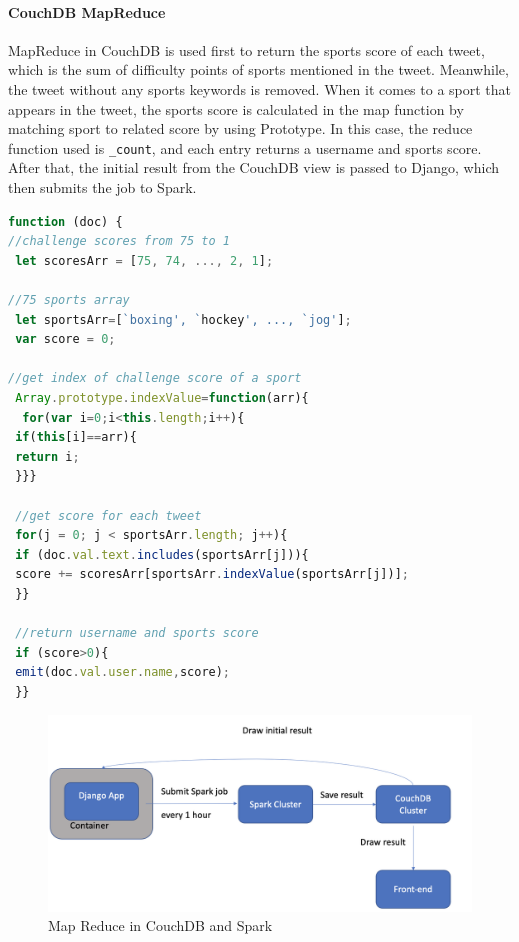 \paragraph{CouchDB MapReduce}
MapReduce in CouchDB is used first to return the sports score of each tweet, which is the sum of difficulty points of sports mentioned in the tweet. Meanwhile, the tweet without any sports keywords is removed.  When it comes to a sport that appears in the tweet, the sports score is calculated in the map function by matching sport to related score by using Prototype. In this case, the reduce function used is \texttt{_count}, and each entry returns a username and sports score. After that, the initial result from the CouchDB view is passed to Django, which then submits the job to Spark.

\begin{lstlisting}[language=JavaScript, caption= Map Functions for Sports Score, backgroundcolor = \color{white}]
function (doc) {
//challenge scores from 75 to 1
 let scoresArr = [75, 74, ..., 2, 1]; 
 
//75 sports array
 let sportsArr=[`boxing', `hockey', ..., `jog']; 
 var score = 0;
 
//get index of challenge score of a sport
 Array.prototype.indexValue=function(arr){
  for(var i=0;i<this.length;i++){
 if(this[i]==arr){
 return i;
 }}}
 
 //get score for each tweet
 for(j = 0; j < sportsArr.length; j++){
 if (doc.val.text.includes(sportsArr[j])){
 score += scoresArr[sportsArr.indexValue(sportsArr[j])];
 }}
 
 //return username and sports score 
 if (score>0){
 emit(doc.val.user.name,score);
 }}

\end{lstlisting}

\begin{figure}[h!]
\centerline{\includegraphics[width=6in]{Figures/couchdb-spark.png}}
\caption{Map Reduce in CouchDB and Spark \label{couchdb and spark}}
\end{figure}
